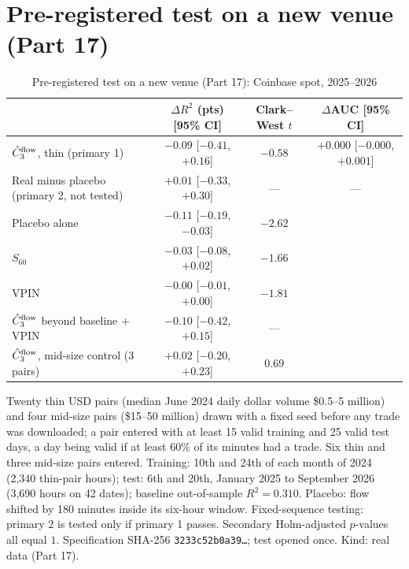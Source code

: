 \documentclass[12pt]{article}
\theoremstyle{definition}
\theoremstyle{remark}
\begin{document}
\section{Pre-registered test on a new venue (Part 17)}
\begin{table}[!tbp]\centering\small
\begin{threeparttable}
\caption{Pre-registered test on a new venue (Part 17): Coinbase spot, 2025--2026}\label{tab:p17}
\footnotesize\setlength{\tabcolsep}{3pt}
\begin{tabular}{lccc}
\toprule
 & $\Delta R^2$ (pts) [95\% CI] & Clark--West $t$ & $\Delta$AUC [95\% CI]\\
\midrule
$\hat C_3^{\rm flow}$, thin (primary 1) & $-0.09$ [$-0.41$, $+0.16$] & $-0.58$ & $+0.000$ [$-0.000$, $+0.001$]\\
Real minus placebo (primary 2, not tested) & $+0.01$ [$-0.33$, $+0.30$] & --- & ---\\
Placebo alone & $-0.11$ [$-0.19$, $-0.03$] & $-2.62$ & \\
$S_{60}$ & $-0.03$ [$-0.08$, $+0.02$] & $-1.66$ & \\
VPIN & $-0.00$ [$-0.01$, $+0.00$] & $-1.81$ & \\
$\hat C_3^{\rm flow}$ beyond baseline + VPIN & $-0.10$ [$-0.42$, $+0.15$] & --- & \\
$\hat C_3^{\rm flow}$, mid-size control (3 pairs) & $+0.02$ [$-0.20$, $+0.23$] & $0.69$ & \\
\bottomrule
\end{tabular}
\begin{tablenotes}\footnotesize\item Twenty thin USD pairs (median June 2024 daily dollar volume \$0.5--5 million) and four mid-size pairs (\$15--50 million) drawn with a fixed seed before any trade was downloaded; a pair entered with at least 15 valid training and 25 valid test days, a day being valid if at least 60\% of its minutes had a trade. Six thin and three mid-size pairs entered. Training: 10th and 24th of each month of 2024 (2{,}340 thin-pair hours); test: 6th and 20th, January 2025 to September 2026 (3{,}690 hours on 42 dates); baseline out-of-sample $R^2=0.310$. Placebo: flow shifted by 180 minutes inside its six-hour window. Fixed-sequence testing: primary 2 is tested only if primary 1 passes. Secondary Holm-adjusted $p$-values all equal $1$. Specification SHA-256 \texttt{3233c52b0a39\ldots}; test opened once. Kind: real data (Part 17).\end{tablenotes}
\end{threeparttable}
\end{table}
\end{document}
